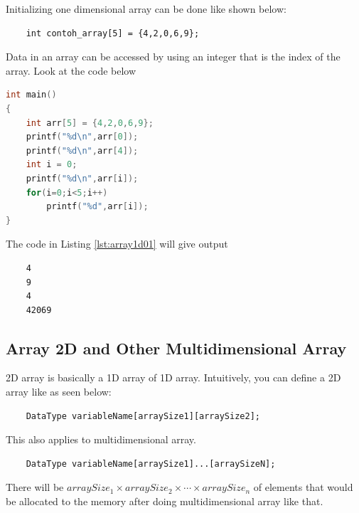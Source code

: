 Initializing one dimensional array can be done like shown below:
\begin{verbatim}
    int contoh_array[5] = {4,2,0,6,9};
\end{verbatim}

Data in an array can be accessed by using an integer that is the index of the array. Look at the code below

\begin{lstlisting}[language=c,caption = Accessing 1D array implementation,label=lst:array1d01]
int main()
{
    int arr[5] = {4,2,0,6,9};
    printf("%d\n",arr[0]);
    printf("%d\n",arr[4]);
    int i = 0;
    printf("%d\n",arr[i]);
    for(i=0;i<5;i++)
        printf("%d",arr[i]);
}
\end{lstlisting}

The code in Listing \ref{lst:array1d01} will give output
\begin{verbatim}
    4
    9
    4
    42069
\end{verbatim}

\subsection{Array 2D and Other Multidimensional Array}%
2D array is basically a 1D array of 1D array. Intuitively, you can define a 2D array like as seen below:
\begin{verbatim}
	DataType variableName[arraySize1][arraySize2];
\end{verbatim}
This also applies to multidimensional array.
\begin{verbatim}
    DataType variableName[arraySize1]...[arraySizeN];
\end{verbatim}
There will be $arraySize_1\times arraySize_2 \times \cdots \times arraySize_n$ of elements that would be allocated to the memory after doing multidimensional array like that.

